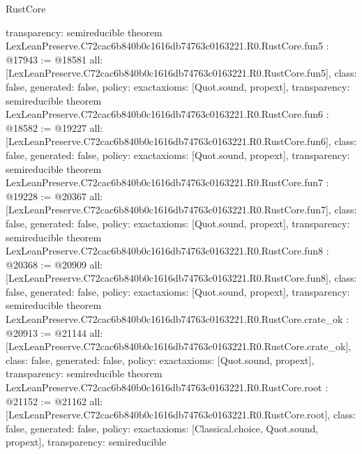 \begin{lexlean}{RustCore}
\begin{coremodule}
{  transparency: semireducible
}
theorem LexLeanPreserve.C72cac6b840b0c1616db74763c0163221.R0.RustCore.fun5 : @17943 := @18581 {
  all: [LexLeanPreserve.C72cac6b840b0c1616db74763c0163221.R0.RustCore.fun5],
  class: false,
  generated: false,
  policy: exact{axioms: [Quot.sound, propext]},
  transparency: semireducible
}
theorem LexLeanPreserve.C72cac6b840b0c1616db74763c0163221.R0.RustCore.fun6 : @18582 := @19227 {
  all: [LexLeanPreserve.C72cac6b840b0c1616db74763c0163221.R0.RustCore.fun6],
  class: false,
  generated: false,
  policy: exact{axioms: [Quot.sound, propext]},
  transparency: semireducible
}
theorem LexLeanPreserve.C72cac6b840b0c1616db74763c0163221.R0.RustCore.fun7 : @19228 := @20367 {
  all: [LexLeanPreserve.C72cac6b840b0c1616db74763c0163221.R0.RustCore.fun7],
  class: false,
  generated: false,
  policy: exact{axioms: [Quot.sound, propext]},
  transparency: semireducible
}
theorem LexLeanPreserve.C72cac6b840b0c1616db74763c0163221.R0.RustCore.fun8 : @20368 := @20909 {
  all: [LexLeanPreserve.C72cac6b840b0c1616db74763c0163221.R0.RustCore.fun8],
  class: false,
  generated: false,
  policy: exact{axioms: [Quot.sound, propext]},
  transparency: semireducible
}
theorem LexLeanPreserve.C72cac6b840b0c1616db74763c0163221.R0.RustCore.crate_ok : @20913 := @21144 {
  all: [LexLeanPreserve.C72cac6b840b0c1616db74763c0163221.R0.RustCore.crate_ok],
  class: false,
  generated: false,
  policy: exact{axioms: [Quot.sound, propext]},
  transparency: semireducible
}
theorem LexLeanPreserve.C72cac6b840b0c1616db74763c0163221.R0.RustCore.root : @21152 := @21162 {
  all: [LexLeanPreserve.C72cac6b840b0c1616db74763c0163221.R0.RustCore.root],
  class: false,
  generated: false,
  policy: exact{axioms: [Classical.choice, Quot.sound, propext]},
  transparency: semireducible
}


\end{coremodule}
\end{lexlean}

